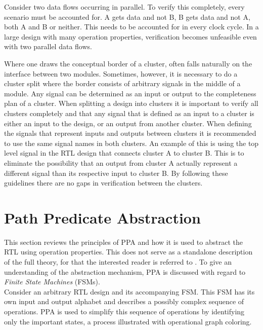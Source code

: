 Consider two data flows occurring in parallel. To verify this completely, every scenario must be accounted for. A gets data and not B, B gets data and not A, both A and B or neither. This needs to be accounted for in every clock cycle. In a large design with many operation properties, verification becomes unfeasible even with two parallel data flows.     


Where one draws the conceptual border of a cluster, often falls naturally on the interface between two modules. Sometimes, however, it is necessary to do a cluster split where the border consists of arbitrary signals in the middle of a module. Any signal can be determined as an input or output to the completeness plan of a cluster\cite{clust}. When splitting a design into clusters it is important to verify all clusters completely and that any signal that is defined as an input to a cluster is either an input to the design, or an output from another cluster. When defining the signals that represent inputs and outputs between clusters it is recommended to use the same signal names in both clusters. An example of this is using the top level signal in the RTL design that connects cluster A to cluster B. This is to eliminate the possibility that an output from cluster A actually represent a different signal than its respective input to cluster B. By following these guidelines there are no gaps in verification between the clusters. 



\section{Path Predicate Abstraction}
\label{sec:ppa}

This section reviews the principles of PPA and how it is used to abstract the RTL using operation properties. This does not serve as a standalone description of the full theory, for that the interested reader is referred to \cite{2014-UrdahlStoffel.etal}. To give an understanding of the abstraction mechanism, PPA is discussed with regard to \textit{Finite State Machines} (FSMs). \\
Consider an arbitrary RTL design and its accompanying FSM. This FSM has its own input and output alphabet and describes a possibly complex sequence of operations. PPA is used to simplify this sequence of operations by identifying only the important states, a process illustrated with operational graph coloring. \\ 

